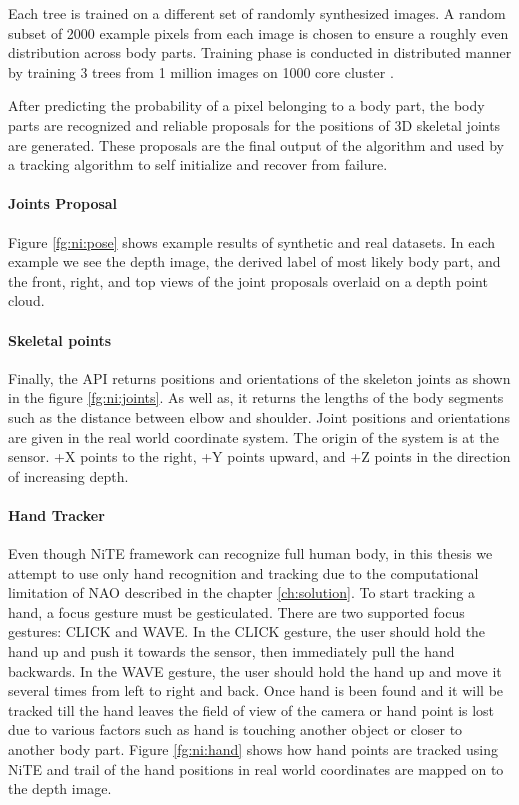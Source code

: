 

Each tree is trained on a different set of randomly synthesized images. A random subset of 2000 example pixels from each image is chosen to ensure a roughly even distribution across body parts. Training phase is conducted in distributed manner by training 3 trees from 1 million images on 1000 core cluster \cite{13}.

After predicting the probability of a pixel belonging to a body part, the body parts are recognized and reliable proposals for the positions of 3D skeletal joints are generated. These proposals are the final output of the algorithm and used by a tracking algorithm to self initialize and recover from failure.



\paragraph*{Joints Proposal} Figure \ref{fg:ni:pose} shows example results of synthetic and real datasets. In each example we see the depth image, the derived label of most likely body part, and the front, right, and top views of the joint proposals overlaid on a depth point cloud.

\paragraph*{Skeletal points} Finally, the API returns positions and orientations of the skeleton joints as shown in the figure \ref{fg:ni:joints}. As well as, it returns the lengths of the body segments such as the distance between elbow and shoulder. Joint positions and orientations are given in the real world coordinate system. The origin of the system is at the sensor. +X points to the right, +Y points upward, and +Z points in the direction of increasing depth. 





\paragraph*{Hand Tracker} Even though NiTE framework can recognize full human body, in this thesis we attempt to use only hand recognition and tracking due to the computational limitation of NAO described in the chapter \ref{ch:solution}. To start tracking a hand, a focus gesture must be gesticulated. There are two supported focus gestures: CLICK and WAVE. In the CLICK gesture, the user should hold the hand up and push it towards the sensor, then immediately pull the hand backwards. In the WAVE gesture, the user should hold the hand up and move it several times from left to right and back. Once hand is been found and it will be tracked till the hand leaves the field of view of the camera or hand point is lost due to various factors such as hand is touching another object or closer to another body part. Figure \ref{fg:ni:hand} shows how hand points are tracked using NiTE and trail of the hand positions in real world coordinates are mapped on to the depth image.

